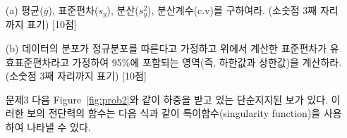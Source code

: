 \documentclass[a4,10pt]{article}
\theoremstyle{examplestyle}
\begin{document}
\begin{itemize}
\item[(a)] 평균($\bar{y}$), 표준편차($s_{y}$), 분산($s_{y}^{2}$), 분산계수(c.v)를 구하여라. (소숫점 3째 자리까지 표기) [10점]
\item[(b)] 데이터의 분포가 정규분포를 따른다고 가정하고 위에서 계산한 표준편차가 유효표준편차라고 가정하여 95\%에 포함되는 영역(즉, 하한값과 상한값)을 계산하라. (소숫점 3째 자리까지 표기) [10점]
\end{itemize}
\begin{itemize}
\item[문제3] 다음 Figure~\ref{fig:prob2}와 같이 하중을 받고 있는 단순지지된 보가 있다. 이러한 보의 전단력의 함수는 다음 식과 같이 특이함수(singularity function)을 사용하여 나타낼 수 있다.
\end{itemize}
\end{document}
